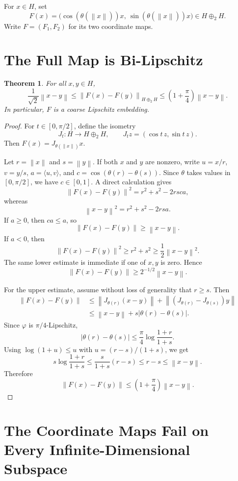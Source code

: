 \documentclass[11pt]{article}
\newtheorem{theorem}{Theorem}
\newcommand{\norm}[1]{\left\lVert #1 \right\rVert}
\begin{document}
For $x\in H$, set
\[
  F(x)=
  \big(\cos(\theta(\norm{x}))x,\ \sin(\theta(\norm{x}))x\big)
  \in H\oplus_2 H.
\]
Write $F=(F_1,F_2)$ for its two coordinate maps.

\section*{The Full Map is Bi-Lipschitz}

\begin{theorem}
For all $x,y\in H$,
\[
  \frac{1}{\sqrt 2}\norm{x-y}
  \le
  \norm{F(x)-F(y)}_{H\oplus_2H}
  \le
  \left(1+\frac{\pi}{4}\right)\norm{x-y}.
\]
In particular, $F$ is a coarse Lipschitz embedding.
\end{theorem}

\begin{proof}
For $t\in[0,\pi/2]$, define the isometry
\[
  J_t:H\to H\oplus_2 H,\qquad J_t z=(\cos t\,z,\sin t\,z).
\]
Then $F(x)=J_{\theta(\norm{x})}x$.

Let $r=\norm{x}$ and $s=\norm{y}$. If both $x$ and $y$ are nonzero, write
$u=x/r$, $v=y/s$, $a=\langle u,v\rangle$, and
$c=\cos(\theta(r)-\theta(s))$. Since $\theta$ takes values in
$[0,\pi/2]$, we have $c\in[0,1]$. A direct calculation gives
\[
  \norm{F(x)-F(y)}^2
  =
  r^2+s^2-2rsca,
\]
whereas
\[
  \norm{x-y}^2=r^2+s^2-2rsa.
\]
If $a\ge 0$, then $ca\le a$, so
\[
  \norm{F(x)-F(y)}\ge \norm{x-y}.
\]
If $a<0$, then
\[
  \norm{F(x)-F(y)}^2\ge r^2+s^2
  \ge \frac12 \norm{x-y}^2.
\]
The same lower estimate is immediate if one of $x,y$ is zero. Hence
\[
  \norm{F(x)-F(y)}\ge 2^{-1/2}\norm{x-y}.
\]

For the upper estimate, assume without loss of generality that $r\ge s$.
Then
\[
\begin{aligned}
  \norm{F(x)-F(y)}
  &\le
  \norm{J_{\theta(r)}(x-y)}
  +
  \norm{(J_{\theta(r)}-J_{\theta(s)})y} \\
  &\le
  \norm{x-y}+s|\theta(r)-\theta(s)|.
\end{aligned}
\]
Since $\varphi$ is $\pi/4$-Lipschitz,
\[
  |\theta(r)-\theta(s)|
  \le
  \frac{\pi}{4}\log\frac{1+r}{1+s}.
\]
Using $\log(1+u)\le u$ with $u=(r-s)/(1+s)$, we get
\[
  s\log\frac{1+r}{1+s}
  \le
  \frac{s}{1+s}(r-s)
  \le r-s
  \le \norm{x-y}.
\]
Therefore
\[
  \norm{F(x)-F(y)}
  \le
  \left(1+\frac{\pi}{4}\right)\norm{x-y}.
\]
\end{proof}

\section*{The Coordinate Maps Fail on Every Infinite-Dimensional Subspace}
\end{document}

